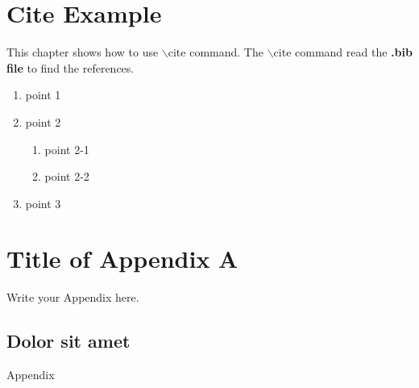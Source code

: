 \newpage
{}
\chapter{Cite Example}
\pagestyle{plain}

\begin{spacing}{2.0}

This chapter shows how to use $\backslash$cite command. The $\backslash$cite command read the \textbf{.bib file} to find the references.

\begin{enumerate}
  \item{point 1 \cite{test1}}
  \item{point 2 \cite{test2}}
    \begin{enumerate}
      \item{point 2-1 \cite{test3}}
      \item{point 2-2}
    \end{enumerate}
  \item{point 3 \cite{test4}}
\end{enumerate}

\end{spacing}

\clearpage
{}


\singlespacing
\newpage
{}
\renewcommand\bibname{References}	%


\clearpage
{}

\BeginAppendixChapter				%
\SetupAppendixNumberingFormat		%
\newpage
{}
\chapter{Title of Appendix A}

\begin{spacing}{2.0}

Write your Appendix here.

  \section{Dolor sit amet}
    Appendix

\end{spacing}

\clearpage
{}

